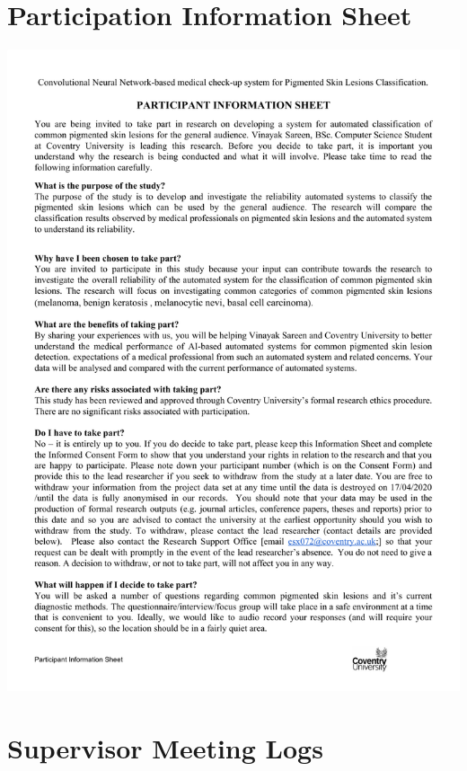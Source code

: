 \section*{Participation Information Sheet}
\begin{center}
    \includegraphics[width=15cm]{Documents/participation.pdf}
\end{center}

\section*{Supervisor Meeting Logs}